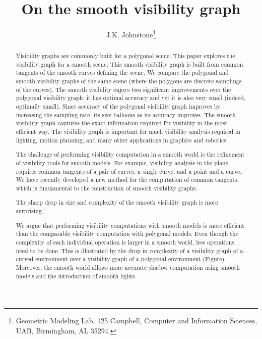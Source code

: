 \documentclass[11pt,twocolumn]{article}
\title{On the smooth visibility graph}
\author{J.K. Johnstone\thanks{Geometric Modeling Lab, 125 Campbell, 
	Computer and Information Sciences, UAB, Birmingham, AL 35294.}}
\begin{document}
\maketitle

\begin{abstract}
Visibility graphs are commonly built for a polygonal scene.
This paper explores the visibility graph for a smooth scene.
This smooth visibility graph is built from common tangents of the smooth curves
defining the scene.
We compare the polygonal and smooth visibility graphs of the same scene
(where the polygons are discrete samplings of the curves).
The smooth visibility enjoys two significant improvements over the polygonal visibility graph:
it has optimal accuracy and yet it is also very small (indeed, optimally small).
Since accuracy of the polygonal visibility graph 
improves by increasing the sampling rate,
its size balloons as its accuracy improves.
The smooth visibility graph captures the exact information required
for visibility in the most efficient way.
The visibility graph is important for much visibility analysis required
in lighting, motion planning, and many
other applications in graphics and robotics.

The challenge of performing visibility computation in a smooth world
is the refinement of visibility tools for smooth models.
For example, visibility analysis in the plane requires common tangents
of a pair of curves, a single curve, and a point and a curve.
We have recently developed a new method for the computation of common tangents,
which is fundamental to the construction of smooth visibility graphs.

The sharp drop in size and complexity of the smooth visibility graph
is more surprising.

We argue that performing visibility computations with smooth models
is more efficient than the comparable visibility computation with
polygonal models.
Even though the complexity of each individual operation is larger in a 
smooth world, less operations need to be done.
This is illustrated by the drop in complexity of a visibility graph
of a curved environment over a visibility graph of a polygonal 
environment (Figure).
Moreover, the smooth world allows more accurate shadow computation 
using smooth models and the introduction of smooth lights.
\end{abstract}
\end{document}
